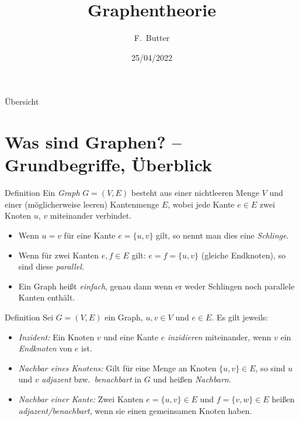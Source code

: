 \documentclass{beamer}
\title{Graphentheorie}
\author{F.~Butter}
\date{25/04/2022}
\institute{Technische Universität Dresden}
\begin{document}
\maketitle

\begin{frame}{Übersicht}
	\tableofcontents
\end{frame}

\section[Was sind Graphen?]{Was sind Graphen? -- Grundbegriffe, Überblick}

\begin{frame}{\secname}
	\begin{block}{Definition} 
		Ein \emph{Graph} $G = (V, E)$ besteht aus einer nichtleeren Menge $V$ und einer (möglicherweise leeren) Kantenmenge $E$, wobei jede Kante $e \in E$ zwei Knoten $u$, $v$ miteinander verbindet.
	\end{block}
\end{frame}

\begin{frame}
	\begin{itemize}
		\item Wenn $u = v$ für eine Kante $e = \{u, v\}$ gilt, so nennt man dies eine \emph{Schlinge}. 
		\item Wenn für zwei Kanten $e, f \in E$ gilt: $e = f = \{u , v\}$ (gleiche Endknoten), so sind diese \emph{parallel}. 
		\item Ein Graph heißt \emph{einfach}, genau dann wenn er weder Schlingen noch parallele Kanten enthält.
	\end{itemize}
\end{frame}

\begin{frame}
	\begin{block}{Definition}
		Sei $G = (V, E)$ ein Graph, $u, v \in V$ und $e \in E$. Es gilt jeweils:
		\begin{itemize}
			\item \emph{Inzident:} Ein Knoten $v$ und eine Kante $e$ \emph{inzidieren} miteinander, wenn $v$ ein \emph{Endknoten} von $e$ ist.
			\item \emph{Nachbar eines Knotens:} Gilt für eine Menge an Knoten $\{u, v\} \in E$, so sind $u$ und $v$ \emph{adjazent} bzw.\ \emph{benachbart} in $G$ und heißen \emph{Nachbarn}. 
			\item \emph{Nachbar einer Kante:} Zwei Kanten $e = \{u, v\} \in E$ und $f = \{v, w\} \in E$ heißen \emph{adjazent/benachbart}, wenn sie einen gemeinsamen Knoten haben.
		\end{itemize}
	\end{block}
\end{frame}
\end{document}
